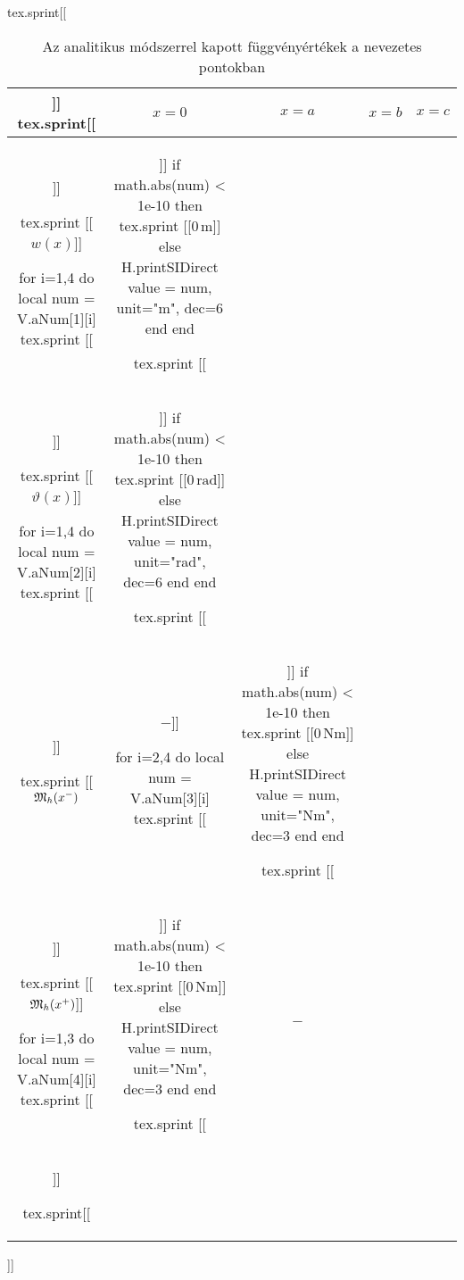 \begin{table}[H]
\centering
\caption{Az analitikus módszerrel kapott függvényértékek a nevezetes pontokban}
\def\arraystretch{1.25}
\begin{luacode*}
  tex.sprint[[\begin{tabular}{c|c|c|c|c|}]]
  tex.sprint[[& $x = 0$ & $x = a$ & $x = b$ & $x = c$ \\\hline]]

  tex.sprint [[$w(x)$]]

  for i=1,4 do
    local num = V.aNum[1][i]
    tex.sprint [[&]]
    if math.abs(num) < 1e-10 then
      tex.sprint [[$0\,\mathrm{m}$]]
    else
      H.printSIDirect { value = num, unit="m", dec=6 }
    end
  end

  tex.sprint [[\\]]

  tex.sprint [[$\vartheta(x)$]]

  for i=1,4 do
    local num = V.aNum[2][i]
    tex.sprint [[&]]
    if math.abs(num) < 1e-10 then
      tex.sprint [[$0\,\mathrm{rad}$]]
    else
      H.printSIDirect { value = num, unit="rad", dec=6 }
    end
  end

  tex.sprint [[\\]]

  tex.sprint [[$\mathfrak{M}_h(x^-)$ & $-$]]

  for i=2,4 do
    local num = V.aNum[3][i]
    tex.sprint [[&]]
    if math.abs(num) < 1e-10 then
      tex.sprint [[$0\,\mathrm{Nm}$]]
    else
      H.printSIDirect { value = num, unit="Nm", dec=3 }
    end
  end

  tex.sprint [[\\]]

  tex.sprint [[$\mathfrak{M}_h(x^+)$]]

  for i=1,3 do
    local num = V.aNum[4][i]
    tex.sprint [[&]]
    if math.abs(num) < 1e-10 then
      tex.sprint [[$0\,\mathrm{Nm}$]]
    else
      H.printSIDirect { value = num, unit="Nm", dec=3 }
    end
  end

  tex.sprint [[& $-$ \\\hline]]

  tex.sprint[[\end{tabular}]]
\end{luacode*}
\end{table}
